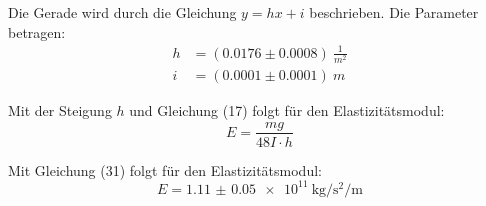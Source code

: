 Die Gerade wird durch die Gleichung $y = hx + i$ beschrieben. Die Parameter betragen:
\begin{align*}
  h &= (0.0176 \pm 0.0008) \: \frac{1}{m^2} \\
  i &= (0.0001  \pm 0.0001) \: m
\end{align*}

Mit der Steigung $h$ und Gleichung (17) folgt für den Elastizitätsmodul:
\begin{equation}
  E = \frac{mg}{48I \cdot h}
\end{equation}


Mit Gleichung (31) folgt für den Elastizitätsmodul:
\begin{equation}
  E = \SI{1.11(5)e11}{\kilo\gram\per\second\squared\per\meter}
\end{equation}
